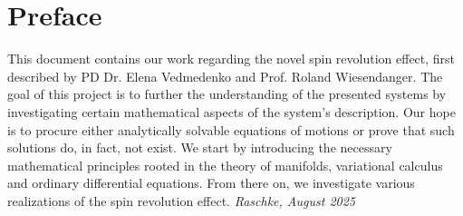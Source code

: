 \chapter*{Preface}
\label{ch:preface}
This document contains our work regarding the novel spin revolution effect, first described by PD Dr. Elena Vedmedenko and Prof. Roland Wiesendanger\cite{Vedmedenko}. The goal of this project is to further the understanding of the presented systems by investigating certain mathematical aspects of the system's description. Our hope is to procure either analytically solvable equations of motions or prove that such solutions do, in fact, not exist. We start by introducing the necessary mathematical principles rooted in the theory of manifolds, variational calculus and ordinary differential equations. From there on, we investigate various realizations of the spin revolution effect.
\hfill \emph{Raschke, August 2025}
